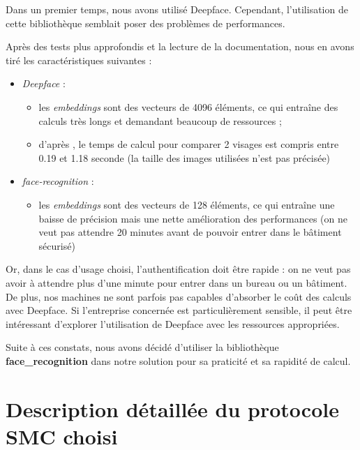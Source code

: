 \documentclass[12pt,a4paper]{article}
\begin{document}
Dans un premier temps, nous avons utilisé Deepface. Cependant, l'utilisation de cette bibliothèque semblait poser des problèmes de performances.

Après des tests plus approfondis et la lecture de la documentation, nous en avons tiré les caractéristiques suivantes :
\begin{itemize}
    \item \textit{Deepface} :
    \begin{itemize}[label=$\star$]
        \item les \textit{embeddings} sont des vecteurs de 4096 éléments, ce qui entraîne des calculs très longs et demandant beaucoup de ressources ;
        \item d'après \cite{article}, le temps de calcul pour comparer 2 visages est compris entre 0.19 et 1.18 seconde (la taille des images utilisées n'est pas précisée)
    \end{itemize}
    \item \textit{face-recognition} :
    \begin{itemize}[label=$\star$]
        \item les \textit{embeddings} sont des vecteurs de 128 éléments, ce qui entraîne une baisse de précision mais une nette amélioration des performances (on ne veut pas attendre 20 minutes avant de pouvoir entrer dans le bâtiment sécurisé)
    \end{itemize}
\end{itemize}

Or, dans le cas d'usage choisi, l'authentification doit être rapide : on ne veut pas avoir à attendre plus d'une minute pour entrer dans un bureau ou un bâtiment. De plus, nos machines ne sont parfois pas capables d'absorber le coût des calculs avec Deepface. Si l'entreprise concernée est particulièrement sensible, il peut être intéressant d'explorer l'utilisation de Deepface avec les ressources appropriées.

Suite à ces constats, nous avons décidé d'utiliser la bibliothèque \textbf{face\_recognition} dans notre solution pour sa praticité et sa rapidité de calcul.

\section{Description détaillée du protocole SMC choisi} \label{SSS}
\end{document}
